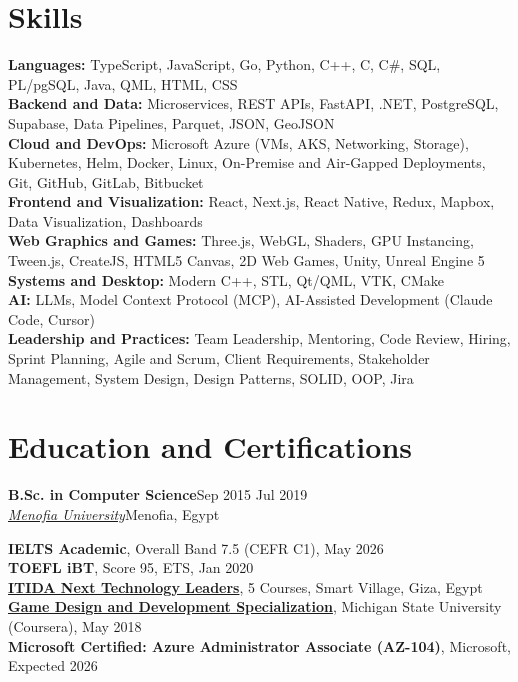 \documentclass[10pt,a4paper]{article}
\newcommand{\job}[4]{%
  \vspace{4pt}\textbf{#1}\hfill #4\\
  \textit{#2}\hfill #3\par\vspace{1pt}}
\begin{document}
\section{Skills}
\textbf{Languages:} TypeScript, JavaScript, Go, Python, C++, C, C\#, SQL, PL/pgSQL, Java, QML, HTML, CSS\\
\textbf{Backend and Data:} Microservices, REST APIs, FastAPI, .NET, PostgreSQL, Supabase, Data Pipelines, Parquet, JSON, GeoJSON\\
\textbf{Cloud and DevOps:} Microsoft Azure (VMs, AKS, Networking, Storage), Kubernetes, Helm, Docker, Linux,
On-Premise and Air-Gapped Deployments, Git, GitHub, GitLab, Bitbucket\\
\textbf{Frontend and Visualization:} React, Next.js, React Native, Redux, Mapbox, Data Visualization, Dashboards\\
\textbf{Web Graphics and Games:} Three.js, WebGL, Shaders, GPU Instancing, Tween.js, CreateJS, HTML5 Canvas, 2D Web Games, Unity, Unreal Engine 5\\
\textbf{Systems and Desktop:} Modern C++, STL, Qt/QML, VTK, CMake\\
\textbf{AI:} LLMs, Model Context Protocol (MCP), AI-Assisted Development (Claude Code, Cursor)\\
\textbf{Leadership and Practices:} Team Leadership, Mentoring, Code Review, Hiring, Sprint Planning, Agile and Scrum,
Client Requirements, Stakeholder Management, System Design, Design Patterns, SOLID, OOP, Jira

\section{Education and Certifications}
\job{B.Sc. in Computer Science}{\href{https://www.menofia.edu.eg/Home/en}{Menofia University}}{Menofia, Egypt}{Sep 2015 \textendash{} Jul 2019}
\vspace{5pt}
\textbf{IELTS Academic}, Overall Band 7.5 (CEFR C1), May 2026\\
\textbf{TOEFL iBT}, Score 95, ETS, Jan 2020\\
\textbf{\href{https://itida.gov.eg/English/Pages/default.aspx}{ITIDA Next Technology Leaders}}, 5 Courses, Smart Village, Giza, Egypt\\
\textbf{\href{https://www.coursera.org/account/accomplishments/specialization/AGGR96534P3B}{Game Design and Development Specialization}}, Michigan State University (Coursera), May 2018\\
\textbf{Microsoft Certified: Azure Administrator Associate (AZ-104)}, Microsoft, Expected 2026
\end{document}
